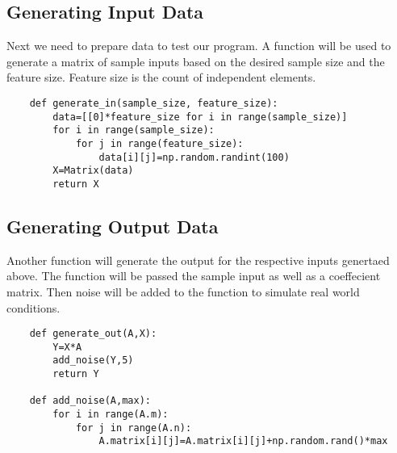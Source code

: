 \subsection{Generating Input Data}
Next we need to prepare data to test our program. 
A function will be used to generate a matrix of sample inputs based on the desired sample size and the feature size. 
Feature size is the count of independent elements.
\begin{lstlisting}
    def generate_in(sample_size, feature_size):
        data=[[0]*feature_size for i in range(sample_size)]
        for i in range(sample_size):
            for j in range(feature_size):
                data[i][j]=np.random.randint(100)
        X=Matrix(data)
        return X
\end{lstlisting}
\subsection{Generating Output Data}
Another function will generate the output for the respective inputs genertaed above.
The function will be passed the sample input as well as a coeffecient matrix. 
Then noise will be added to the function to simulate real world conditions.

\begin{lstlisting}
    def generate_out(A,X):
        Y=X*A
        add_noise(Y,5)
        return Y

    def add_noise(A,max):
        for i in range(A.m):
            for j in range(A.n):
                A.matrix[i][j]=A.matrix[i][j]+np.random.rand()*max
\end{lstlisting}
